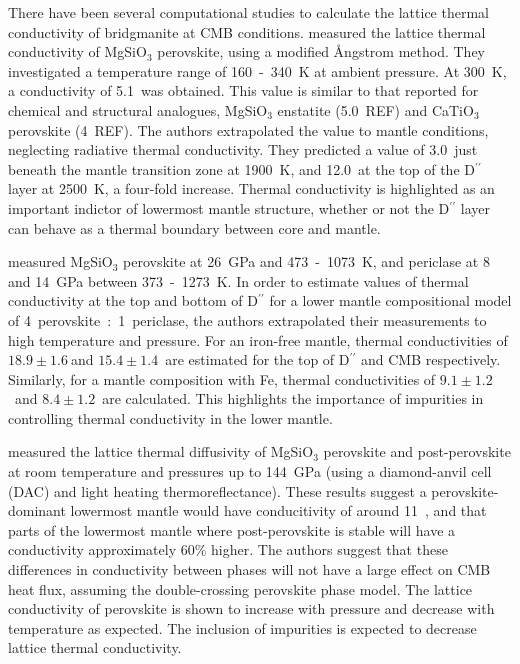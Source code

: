 There have been several computational studies to calculate the lattice thermal conductivity of bridgmanite at CMB conditions. \citet{Osako1991} measured the lattice thermal conductivity of MgSiO$_3$ perovskite, using a modified \AA ngstrom method. They investigated a temperature range of 160~-~340~K at ambient pressure. At 300~K, a conductivity of 5.1~\wmk was obtained. This value is similar to that reported for chemical and structural analogues, MgSiO$_3$ enstatite (5.0~\wmk REF) and CaTiO$_{3}$ perovskite (4~\wmk REF). The authors extrapolated the value to mantle conditions, neglecting radiative thermal conductivity. They predicted a value of 3.0~\wmk just beneath the mantle transition zone at 1900~K, and 12.0~\wmks at the top of the D$^{\prime \prime}$ layer at 2500~K, a four-fold increase. Thermal conductivity is highlighted as an important indictor of lowermost mantle structure, whether or not the D$^{\prime \prime}$ layer can behave as a thermal boundary between core and mantle.

\par \citet{Manthilake2011} measured MgSiO$_3$ perovskite at 26~GPa and 473~-~1073~K, and periclase at 8 and 14~GPa between 373~-~1273~K. In order to estimate values of thermal conductivity at the top and bottom of D$^{\prime \prime}$ for a lower mantle compositional model of 4~perovskite~:~1~periclase, the authors extrapolated their measurements to high temperature and pressure. For an iron-free mantle, thermal conductivities of $18.9\pm1.6~$\wmk and $15.4\pm1.4$~\wmk are estimated for the top of D$^{\prime \prime}$ and CMB respectively. Similarly, for a mantle composition with Fe, thermal conductivities of $9.1\pm1.2$~\wmk and $8.4\pm1.2$~\wmk are calculated. This highlights the importance of impurities in controlling thermal conductivity in the lower mantle.

\par \citet{Ohta2012} measured the lattice thermal diffusivity of MgSiO$_3$ perovskite and post-perovskite at room temperature and pressures up to 144~GPa (using a diamond-anvil cell (DAC) and light heating thermoreflectance). These results suggest a perovskite-dominant lowermost mantle would have conducitivity of around 11~\wmk, and that parts of the lowermost mantle where post-perovskite is stable will have a conductivity approximately 60\% higher. The authors suggest that these differences in conductivity between phases will not have a large effect on CMB heat flux, assuming the double-crossing perovskite phase model. The lattice conductivity of \mgsios perovskite is shown to increase with pressure and decrease with temperature as expected. The inclusion of impurities is expected to decrease lattice thermal conductivity.

